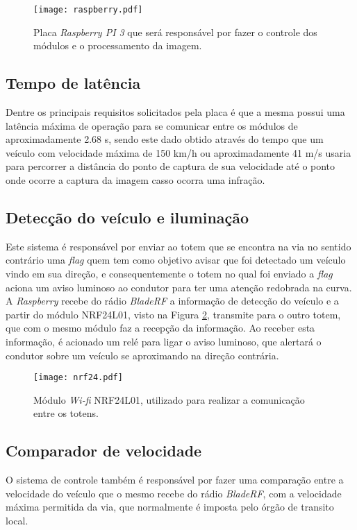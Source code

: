     \begin{figure}[H]
    \centering
   \texttt{[image: raspberry.pdf]}
   \caption{Placa \emph{Raspberry PI 3} que será responsável por fazer o controle dos módulos e o processamento da imagem.}
   \label{raspberry}
    \end{figure}
    
    
    \subsection{Tempo de latência}
    Dentre os principais requisitos solicitados pela placa é que a mesma possui uma latência máxima de operação para se comunicar entre os módulos de aproximadamente 2.68 s, sendo este dado obtido através do tempo que um veículo com velocidade máxima de 150 km/h ou aproximadamente 41 m/s usaria para percorrer a distância do ponto de captura de sua velocidade até o ponto onde ocorre a captura da imagem casso ocorra uma infração. 
    
    \subsection{Detecção do veículo e iluminação}
    Este sistema é responsável por enviar ao totem que se encontra na via no sentido contrário uma \emph{flag} quem tem como objetivo avisar que foi detectado um veículo vindo em sua direção, e consequentemente o totem no qual foi enviado a \emph{flag} aciona um aviso luminoso ao condutor para ter uma atenção redobrada na curva. A \emph{Raspberry} recebe do rádio \emph{BladeRF} a informação de detecção do veículo e a partir do módulo NRF24L01, visto na Figura \ref{nrf24}, transmite para o outro totem, que com o mesmo módulo faz a recepção da informação. Ao receber esta informação, é acionado um relé para ligar o aviso luminoso, que alertará o condutor sobre um veículo se aproximando na direção contrária.
    
    \begin{figure}[H]
    \centering
    \texttt{[image: nrf24.pdf]}
    \caption{Módulo \emph{Wi-fi} NRF24L01, utilizado para realizar a comunicação entre os totens.}
    \label{nrf24}
\end{figure}


    \subsection{Comparador de velocidade}
    O sistema de controle também é responsável por fazer uma comparação entre a velocidade do veículo que o mesmo recebe do rádio \emph{BladeRF}, com a velocidade máxima permitida da via, que normalmente é imposta pelo órgão de transito local.

